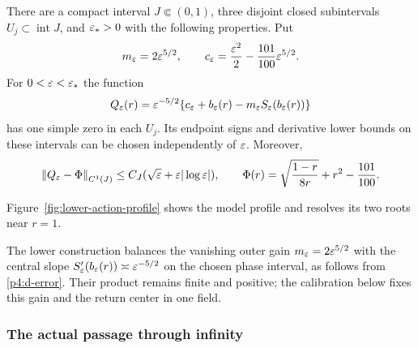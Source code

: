 \begin{lemma}\label{p4:model}
There are a compact interval $J\Subset(0,1)$, three disjoint closed
subintervals $U_j\subset\operatorname{int}J$, and $\varepsilon_*>0$ with
the following properties. Put
\[
 m_\varepsilon=2\varepsilon^{5/2},\qquad
 c_\varepsilon=\frac{\varepsilon^2}{2}-\frac{101}{100}\varepsilon^{5/2}.
\]
For $0<\varepsilon<\varepsilon_*$ the function
\[
 Q_\varepsilon(r)=\varepsilon^{-5/2}
 \{c_\varepsilon+b_\varepsilon(r)-m_\varepsilon S_\varepsilon(b_\varepsilon(r))\}
\]
has one simple zero in each $U_j$. Its endpoint signs and derivative
lower bounds on these intervals can be chosen independently of $\varepsilon$.
Moreover,
\begin{equation}\label{p4:model-error}
 \left\lVert Q_\varepsilon-\Phi\right\rVert_{C^1(J)}
 \le C_J(\sqrt{\varepsilon}+\varepsilon|\log\varepsilon|),\qquad
 \Phi(r)=\sqrt{\frac{1-r}{8r}}+r^2-\frac{101}{100}.
\end{equation}
\end{lemma}


Figure~\ref{fig:lower-action-profile} shows the model profile and
resolves its two roots near \(r=1\).


The lower construction balances the vanishing outer gain
$m_\varepsilon=2\varepsilon^{5/2}$ with the central slope
$S_\varepsilon'(b_\varepsilon(r))\asymp\varepsilon^{-5/2}$ on the chosen phase interval,
as follows from \eqref{p4:d-error}. Their product remains finite and
positive; the calibration below fixes this gain and the return center
in one field.

\subsubsection{The actual passage through infinity}

